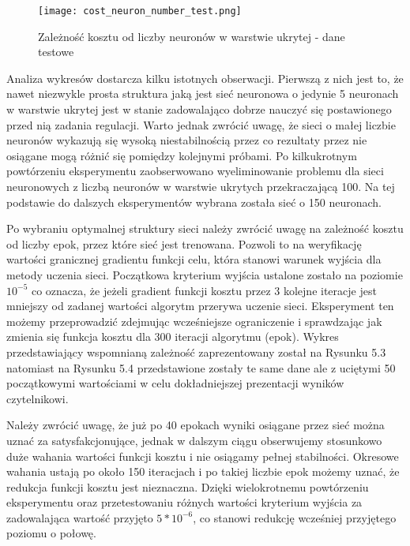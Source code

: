 \begin{figure}[!htb]
  \label{fig:Koszt-liczba-neuronow-testowe}
  \centering \texttt{[image: cost\_neuron\_number\_test.png]}
  \caption{Zależność kosztu od liczby neuronów w warstwie ukrytej - dane testowe}
\end{figure}

\par Analiza wykresów dostarcza kilku istotnych obserwacji. Pierwszą z nich jest to, że nawet niezwykle prosta struktura jaką jest sieć neuronowa o jedynie 5 neuronach w warstwie ukrytej jest w stanie zadowalająco dobrze nauczyć się postawionego przed nią zadania regulacji. Warto jednak zwrócić uwagę, że sieci o małej liczbie neuronów wykazują się wysoką niestabilnością przez co rezultaty przez nie osiągane mogą różnić się pomiędzy kolejnymi próbami. Po kilkukrotnym powtórzeniu eksperymentu zaobserwowano wyeliminowanie problemu dla sieci neuronowych z liczbą neuronów w warstwie ukrytych przekraczającą 100. Na tej podstawie do dalszych eksperymentów wybrana została sieć o 150 neuronach. 
\par Po wybraniu optymalnej struktury sieci należy zwrócić uwagę na zależność kosztu od liczby epok, przez które sieć jest trenowana. Pozwoli to na weryfikację wartości granicznej gradientu funkcji celu, która stanowi warunek wyjścia dla metody uczenia sieci. Początkowa kryterium wyjścia ustalone zostało na poziomie \( 10^{-5} \) co oznacza, że jeżeli gradient funkcji kosztu przez 3 kolejne iteracje jest mniejszy od zadanej wartości algorytm przerywa uczenie sieci. Eksperyment ten możemy przeprowadzić zdejmując wcześniejsze ograniczenie i sprawdzając jak zmienia się funkcja kosztu dla 300 iteracji algorytmu (epok). Wykres przedstawiający wspomnianą zależność zaprezentowany został na Rysunku 5.3 natomiast na Rysunku 5.4 przedstawione zostały te same dane ale z uciętymi 50 początkowymi wartościami w celu dokładniejszej prezentacji wyników czytelnikowi.
\par Należy zwrócić uwagę, że już po 40 epokach wyniki osiągane przez sieć można uznać za satysfakcjonujące, jednak w dalszym ciągu obserwujemy stosunkowo duże wahania wartości funkcji kosztu i nie osiągamy pełnej stabilności. Okresowe wahania ustają po około 150 iteracjach i po takiej liczbie epok możemy uznać, że redukcja funkcji kosztu jest nieznaczna. Dzięki wielokrotnemu  powtórzeniu eksperymentu oraz przetestowaniu różnych wartości kryterium wyjścia za zadowalająca wartość przyjęto \( 5*10^{-6} \), co stanowi redukcję wcześniej przyjętego poziomu o połowę.

